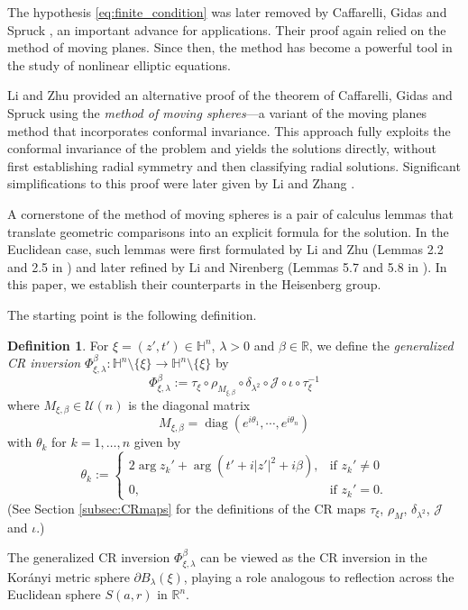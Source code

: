 \documentclass[reqno]{amsart}
\theoremstyle{definition}
\newtheorem{defn}[thm]{Definition}
\theoremstyle{remark}
\numberwithin{equation}{section}
\begin{document}
The hypothesis \eqref{eq:finite_condition} was later removed by Caffarelli, Gidas and Spruck \cite{CGS89}, an important advance for applications. Their proof again relied on the method of moving planes. Since then, the method has become a powerful tool in the study of nonlinear elliptic equations.

Li and Zhu \cite{LZ95} provided an alternative proof of the theorem of Caffarelli, Gidas and Spruck using the \textit{method of moving spheres}---a variant of the moving planes method that incorporates conformal invariance. This approach fully exploits the conformal invariance of the problem and yields the solutions directly, without first establishing radial symmetry and then classifying radial solutions. Significant simplifications to this proof were later given by Li and Zhang \cite{LZ03}.

A cornerstone of the method of moving spheres is a pair of calculus lemmas that translate geometric comparisons into an explicit formula for the solution. In the Euclidean case, such lemmas were first formulated by Li and Zhu (Lemmas 2.2 and 2.5 in \cite{LZ95}) and later refined by Li and Nirenberg (Lemmas 5.7 and 5.8 in \cite{Li04}). In this paper, we establish their counterparts in the Heisenberg group.

The starting point is the following definition.

\begin{defn}\label{def:gndcrinv}
For $\xi=(z',t')\in \mathbb{H}^n$, $\lambda>0$ and $\beta \in \mathbb{R}$, we define
the \emph{generalized CR inversion} $\Phi_{\xi, \lambda}^{\beta}: \mathbb{H}^n\setminus \{\xi\}\to \mathbb{H}^n\setminus \{\xi\}$ by
\begin{equation}\label{eqn:gndcrinv}
\Phi_{\xi, \lambda}^{\beta} := \tau_{\xi} \circ \rho_{M_{\xi,\beta}} \circ \delta_{\lambda^2} \circ
\mathscr{J} \circ \iota \circ \tau_{\xi}^{-1}
\end{equation}
where $M_{\xi,\beta} \in \mathcal{U}(n)$ is the diagonal matrix
\begin{equation}\label{eqn:Mxibeta}
M_{\xi,\beta} = \operatorname{diag} \left( e^{i\theta_1}, \cdots, e^{i\theta_n} \right)
\end{equation}
with $\theta_k$ for $k = 1, \ldots, n$ given by
\[
\theta_k := \begin{cases}
2 \operatorname{arg} z_k' + \operatorname{arg} \left(t'+i|z'|^2
+i\beta\right),& \text{if } z_k'\neq 0\\
0, & \text{if } z_k' = 0.
\end{cases}
\]
(See Section \ref{subsec:CRmaps} for the definitions of the CR maps $\tau_{\xi}$, $\rho_{M}$, $\delta_{\lambda^2}$, $\mathscr{J}$ and $\iota$.)
\end{defn}
The generalized CR inversion $\Phi_{\xi, \lambda}^{\beta}$ can be viewed as the CR inversion in the Kor\'anyi metric 
sphere $\partial B_{\lambda}(\xi)$, playing a role analogous to reflection across the Euclidean sphere $S(a, r)$ in $\mathbb{R}^n$.
\end{document}
